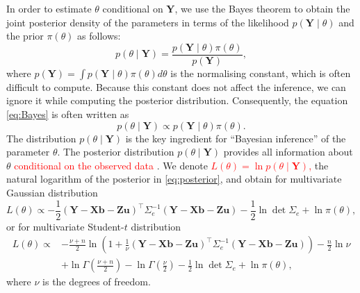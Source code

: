 \documentclass[a4paper]{article}   	%
\begin{document}
	In order to estimate $\theta$ conditional on $\bm{Y}$, we use the Bayes theorem to obtain the joint posterior density of the parameters in terms of the likelihood $p(\bm{Y}\mid\theta)$ and the prior $\pi(\theta)$ as follows:
	\begin{equation}\label{eq:Bayes}
		p(\theta\mid \bm{Y}) = \frac{p(\bm{Y}\mid\theta)\pi(\theta)}{p(\bm{Y})},
	\end{equation}
	where $p(\bm{Y}) = \int p(\bm{Y}\mid\theta)\pi(\theta) d\theta$ is the normalising constant, which is often difficult to compute. Because this constant does not affect the inference, we can ignore it while computing the posterior distribution. Consequently, the equation \eqref{eq:Bayes} is often written as 
	\begin{equation}\label{eq:posterior}
		p(\theta\mid \bm{Y}) \propto p(\bm{Y}\mid\theta)\pi(\theta).
	\end{equation}
The distribution $p(\theta\mid \bm{Y})$ is the key ingredient for ``Bayesian inference'' of the parameter $\theta$. The posterior distribution $p(\theta\mid \bm{Y})$ provides all information about $\theta$ \textcolor{red}{conditional on the observed data} \parencite{Che2010Bayesian}. We denote \textcolor{red}{$L(\theta)=\ln p(\theta\mid\bm{Y})$,} the natural logarithm of the posterior in \eqref{eq:posterior}, and obtain for multivariate Gaussian distribution 
	\begin{equation}\label{eq:logGpost}
		L(\theta) \propto -\frac{1}{2} (\bm{Y}-\bm{X}\bm{b}-\bm{Z}\bm{u})^\top \Sigma_e^{-1}(\bm{Y}-\bm{X}\bm{b}-\bm{Z}\bm{u}) -\frac{1}{2}\ln\det\Sigma_e + \ln \pi(\theta),
	\end{equation}
	or for multivariate Student-$t$ distribution
	\begin{equation}\label{eq:logTpost}
		\begin{split}
			L(\theta) \propto &-\frac{\nu+n}{2}\ln \left( 
			1+\frac{1}{\nu}(\bm{Y}-\bm{X}\bm{b}-\bm{Z}\bm{u})^\top\Sigma_e^{-1}(\bm{Y}-\bm{X}\bm{b}-\bm{Z}\bm{u})  \right) -\frac{n}{2}\ln\nu \\ &+ \ln \Gamma(\frac{\nu+n}{2}) - \ln\Gamma(\frac{\nu}{2})-\frac{1}{2}\ln\det \Sigma_e + \ln \pi(\theta),
		\end{split}
	\end{equation}
	where $\nu$ is the degrees of freedom. 
	
\end{document}

